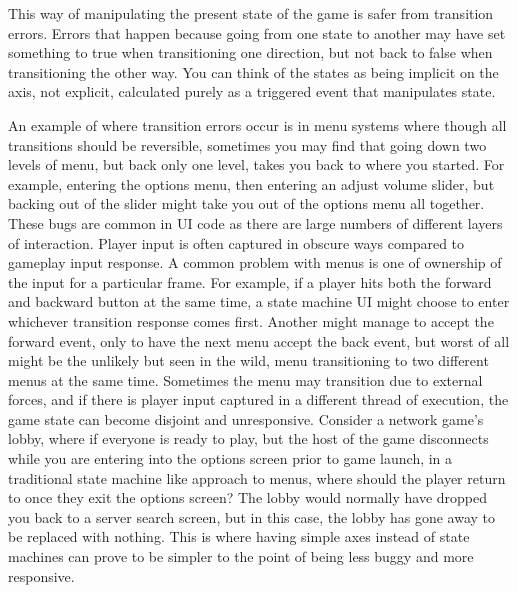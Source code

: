 This way of manipulating the present state of the game is safer from transition
errors. Errors that happen because going from one state to another may have set
something to true when transitioning one direction, but not back to false when
transitioning the other way. You can think of the states as being implicit on
the axis, not explicit, calculated purely as a triggered event that manipulates
state.

An example of where transition errors occur is in menu systems where though all
transitions should be reversible, sometimes you may find that going down two
levels of menu, but back only one level, takes you back to where you started.
For example, entering the options menu, then entering an adjust volume slider,
but backing out of the slider might take you out of the options menu all
together. These bugs are common in UI code as there are large numbers of
different layers of interaction. Player input is often captured in obscure ways
compared to gameplay input response. A common problem with menus is one of
ownership of the input for a particular frame. For example, if a player hits
both the forward and backward button at the same time, a state machine UI might
choose to enter whichever transition response comes first. Another might manage
to accept the forward event, only to have the next menu accept the back event,
but worst of all might be the unlikely but seen in the wild, menu transitioning
to two different menus at the same time. Sometimes the menu may transition due
to external forces, and if there is player input captured in a different thread
of execution, the game state can become disjoint and unresponsive. Consider a
network game's lobby, where if everyone is ready to play, but the host of the
game disconnects while you are entering into the options screen prior to game
launch, in a traditional state machine like approach to menus, where should the
player return to once they exit the options screen? The lobby would normally
have dropped you back to a server search screen, but in this case, the lobby
has gone away to be replaced with nothing. This is where having simple axes
instead of state machines can prove to be simpler to the point of being less
buggy and more responsive.


